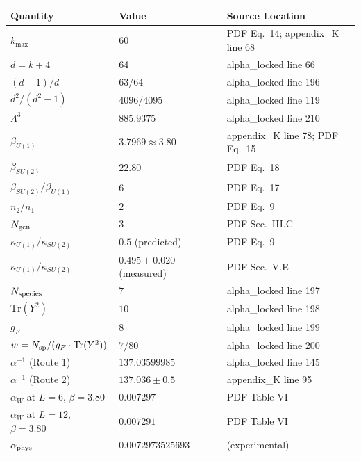 \documentclass[12pt,a4paper]{article}
\begin{document}
\begin{longtable}{p{}p{}p{}}
\toprule
\textbf{Quantity} & \textbf{Value} & \textbf{Source Location} \\
\midrule
$k_{\max}$ & 60 & PDF Eq.~14; appendix\_K line 68 \\
$d = k + 4$ & 64 & alpha\_locked line 66 \\
$(d-1)/d$ & $63/64$ & alpha\_locked line 196 \\
$d^2/(d^2-1)$ & $4096/4095$ & alpha\_locked line 119 \\
$\Lambda^3$ & $885.9375$ & alpha\_locked line 210 \\
$\beta_{U(1)}$ & $3.7969 \approx 3.80$ & appendix\_K line 78; PDF Eq.~15 \\
$\beta_{SU(2)}$ & $22.80$ & PDF Eq.~18 \\
$\beta_{SU(2)}/\beta_{U(1)}$ & $6$ & PDF Eq.~17 \\
$n_2/n_1$ & $2$ & PDF Eq.~9 \\
$N_{\rm gen}$ & $3$ & PDF Sec.~III.C \\
$\kappa_{U(1)}/\kappa_{SU(2)}$ & $0.5$ (predicted) & PDF Eq.~9 \\
$\kappa_{U(1)}/\kappa_{SU(2)}$ & $0.495 \pm 0.020$ (measured) & PDF Sec.~V.E \\
$N_{\rm species}$ & $7$ & alpha\_locked line 197 \\
$\mathrm{Tr}(Y^2)$ & $10$ & alpha\_locked line 198 \\
$g_F$ & $8$ & alpha\_locked line 199 \\
$w = N_{\rm sp}/(g_F \cdot \mathrm{Tr}(Y^2))$ & $7/80$ & alpha\_locked line 200 \\
$\alpha^{-1}$ (Route 1) & $137.03599985$ & alpha\_locked line 145 \\
$\alpha^{-1}$ (Route 2) & $137.036 \pm 0.5$ & appendix\_K line 95 \\
$\alpha_W$ at $L=6$, $\beta=3.80$ & $0.007297$ & PDF Table VI \\
$\alpha_W$ at $L=12$, $\beta=3.80$ & $0.007291$ & PDF Table VI \\
$\alpha_{\rm phys}$ & $0.0072973525693$ & (experimental) \\
\bottomrule
\end{longtable}
\end{document}
